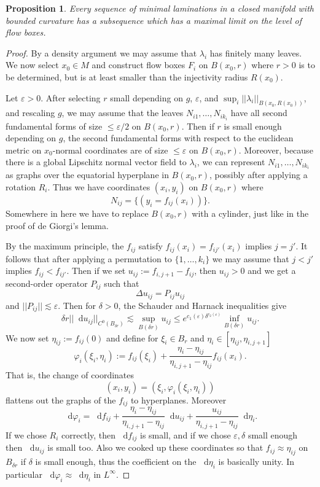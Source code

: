 \documentclass[reqno,10pt]{amsart}
\newcommand*\dif{\mathop{}\!\mathrm{d}}
\newtheorem{proposition}[theorem]{Proposition}
\theoremstyle{definition}
\numberwithin{equation}{section}
\begin{document}
\begin{proposition}
Every sequence of minimal laminations in a closed manifold with bounded curvature has a subsequence which has a maximal limit on the level of flow boxes.
\end{proposition}
\begin{proof}
By a density argument we may assume that $\lambda_i$ has finitely many leaves.
We now select $x_0 \in M$ and construct flow boxes $F_i$ on $B(x_0, r)$ where $r > 0$ is to be determined, but is at least smaller than the injectivity radius $R(x_0)$.

Let $\varepsilon > 0$.
After selecting $r$ small depending on $g$, $\varepsilon$, and $\sup_i ||\lambda_i||_{B(x_0, R(x_0))}$, and rescaling $g$, we may assume that the leaves $N_{i1}, \dots, N_{ik_i}$ have all second fundamental forms of size $\leq \varepsilon/2$ on $B(x_0, r)$.
Then if $r$ is small enough depending on $g$, the second fundamental forms with respect to the euclidean metric on $x_0$-normal coordinates are of size $\leq \varepsilon$ on $B(x_0, r)$.
Moreover, because there is a global Lipschitz normal vector field to $\lambda_i$, we can represent $N_{i1}, \dots, N_{ik_i}$ as graphs over the equatorial hyperplane in $B(x_0, r)$, possibly after applying a rotation $R_i$.
Thus we have coordinates $(x_i, y_i)$ on $B(x_0, r)$ where
$$N_{ij} = \{(y_i = f_{ij}(x_i))\}.$$
Somewhere in here we have to replace $B(x_0, r)$ with a cylinder, just like in the proof of de Giorgi's lemma.

By the maximum principle, the $f_{ij}$ satisfy $f_{ij}(x_i) = f_{ij'}(x_i)$ implies $j = j'$.
It follows that after applying a permutation to $\{1, \dots, k_i\}$ we may assume that $j < j'$ implies $f_{ij} < f_{ij'}$.
Then if we set $u_{ij} := f_{i,j+1} - f_{ij}$, then $u_{ij} > 0$ and we get a second-order operator $P_{ij}$ such that
$$\Delta u_{ij} = P_{ij} u_{ij}$$
and $||P_{ij}|| \lesssim \varepsilon$.
Then for $\delta > 0$, the Schauder and Harnack inequalities give
$$\delta r ||\dif u_{ij}||_{C^0(B_{\delta r})} \lesssim \sup_{B(\delta r)} u_{ij} \leq e^{c_1(\varepsilon) \delta^{c_2(\varepsilon)}} \inf_{B(\delta r)} u_{ij}.$$
We now set $\eta_{ij} := f_{ij}(0)$ and define for $\xi_i \in B_r$ and $\eta_i \in [\eta_{ij}, \eta_{i,j+1}]$
$$\varphi_i(\xi_i, \eta_i) := f_{ij}(\xi_i) + \frac{\eta_i - \eta_{ij}}{\eta_{i,j+1} - \eta_{ij}} f_{ij}(x_i).$$
That is, the change of coordinates
$$(x_i, y_i) = (\xi_i, \varphi_i(\xi_i, \eta_i))$$
flattens out the graphs of the $f_{ij}$ to hyperplanes.
Moreover
$$\dif \varphi_i = \dif f_{ij} + \frac{\eta_i - \eta_{ij}}{\eta_{i,j+1} - \eta_{ij}} \dif u_{ij} + \frac{u_{ij}}{\eta_{i,j+1} - \eta_{ij}} \dif \eta_i.$$
If we chose $R_i$ correctly, then $\dif f_{ij}$ is small, and if we chose $\varepsilon, \delta$ small enough then $\dif u_{ij}$ is small too.
Also we cooked up these coordinates so that $f_{ij} \approx \eta_{ij}$ on $B_{\delta r}$ if $\delta$ is small enough, thus the coefficient on the $\dif \eta_i$ is basically unity.
In particular $\dif \varphi_i \approx \dif \eta_i$ in $L^\infty$.


\end{proof}
\end{document}
